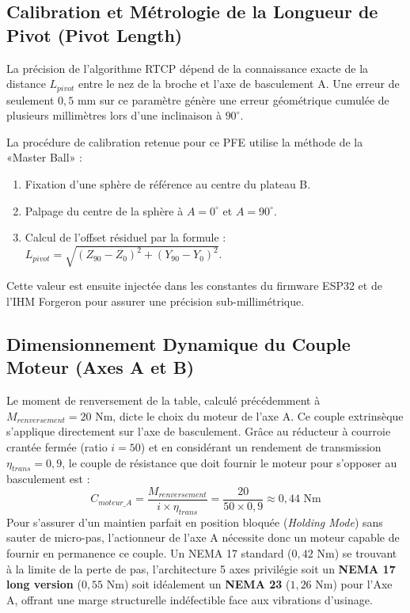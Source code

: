 \subsection{Calibration et Métrologie de la Longueur de Pivot (Pivot Length)}
La précision de l'algorithme RTCP dépend de la connaissance exacte de la distance $L_{pivot}$ entre le nez de la broche et l'axe de basculement A.
Une erreur de seulement $0{,}5 \text{ mm}$ sur ce paramètre génère une erreur géométrique cumulée de plusieurs millimètres lors d'une inclinaison à $90^\circ$.

La procédure de calibration retenue pour ce PFE utilise la méthode de la «Master Ball» :
\begin{enumerate}
    \item Fixation d'une sphère de référence au centre du plateau B.
    \item Palpage du centre de la sphère à $A = 0^\circ$ et $A = 90^\circ$.
    \item Calcul de l'offset résiduel par la formule : $L_{pivot} = \sqrt{(Z_{90} - Z_0)^2 + (Y_{90} - Y_0)^2}$.
\end{enumerate}
Cette valeur est ensuite injectée dans les constantes du firmware ESP32 et de l'IHM Forgeron pour assurer une précision sub-millimétrique.

\subsection{Dimensionnement Dynamique du Couple Moteur (Axes A et B)}
Le moment de renversement de la table, calculé précédemment à $M_{renversement} = 20\text{ Nm}$, dicte le choix du moteur de l'axe A.
Ce couple extrinsèque s'applique directement sur l'axe de basculement. Grâce au réducteur à courroie crantée fermée (ratio $i = 50$) et en considérant un rendement de transmission $\eta_{trans} = 0{,}9$, le couple de résistance que doit fournir le moteur pour s'opposer au basculement est :
\begin{equation}
    C_{moteur\_A} = \frac{M_{renversement}}{i \times \eta_{trans}} = \frac{20}{50 \times 0{,}9} \approx \boxed{0{,}44 \text{ Nm}}
\end{equation}
Pour s'assurer d'un maintien parfait en position bloquée (\textit{Holding Mode}) sans sauter de micro-pas, l'actionneur de l'axe A nécessite donc un moteur capable de fournir en permanence ce couple. Un NEMA 17 standard ($0{,}42\text{ Nm}$) se trouvant à la limite de la perte de pas, l'architecture 5 axes privilégie soit un \textbf{NEMA 17 long version} ($0{,}55\text{ Nm}$) soit idéalement un \textbf{NEMA 23} ($1{,}26\text{ Nm}$) pour l'Axe A, offrant une marge structurelle indéfectible face aux vibrations d'usinage.

